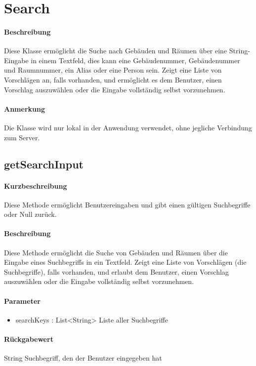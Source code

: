 \section{Search}
\paragraph*{Beschreibung}
Diese Klasse ermöglicht die Suche nach Gebäuden und Räumen über eine String-Eingabe in einem Textfeld, 
dies kann eine Gebäudenummer, Gebäudenummer und Raumnummer, ein Alias oder eine Person sein.
Zeigt eine Liste von Vorschlägen an, falls vorhanden, und ermöglicht es dem Benutzer, einen Vorschlag auszuwählen oder die Eingabe vollständig selbst vorzunehmen.
\paragraph*{Anmerkung}
Die Klasse wird nur lokal in der Anwendung verwendet, ohne jegliche Verbindung zum Server.

\subsection{getSearchInput}%
\paragraph*{Kurzbeschreibung}
Diese Methode ermöglicht Benutzereingaben und gibt einen gültigen Suchbegriffe oder Null zurück.
\paragraph*{Beschreibung}
Diese Methode ermöglicht die Suche von Gebäuden und Räumen über die Eingabe eines Suchbegriffs in ein Textfeld.
Zeigt eine Liste von Vorschlägen (die Suchbegriffe), falls vorhanden, und erlaubt dem Benutzer, einen Vorschlag auszuwählen oder die Eingabe vollständig selbst vorzunehmen.
\paragraph*{Parameter}
\begin{itemize}
    \item searchKeys : List<String> Liste aller Suchbegriffe
\end{itemize}
\paragraph*{Rückgabewert}
String Suchbegriff, den der Benutzer eingegeben hat
